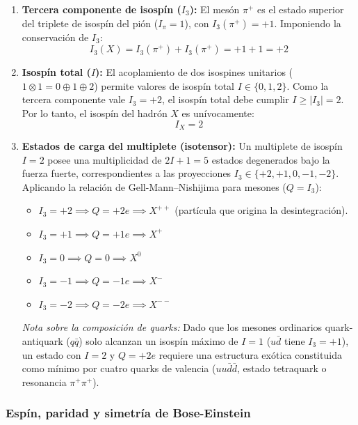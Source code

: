 \begin{problema}
\begin{enumerate}[label=\arabic*.]
    \item \textbf{Tercera componente de isospín ($I_3$):} El mesón $\pi^+$ es el estado superior del triplete de isospín del pión ($I_\pi = 1$), con $I_3(\pi^+) = +1$. Imponiendo la conservación de $I_3$:
    \begin{equation*}
        I_3(X) = I_3(\pi^+) + I_3(\pi^+) = +1 + 1 = +2
    \end{equation*}
    \item \textbf{Isospín total ($I$):} El acoplamiento de dos isospines unitarios ($1 \otimes 1 = 0 \oplus 1 \oplus 2$) permite valores de isospín total $I \in \{0, 1, 2\}$. Como la tercera componente vale $I_3 = +2$, el isospín total debe cumplir $I \ge |I_3| = 2$. Por lo tanto, el isospín del hadrón $X$ es unívocamente:
    \begin{equation*}
        I_X = 2
    \end{equation*}
    \item \textbf{Estados de carga del multiplete (isotensor):} Un multiplete de isospín $I = 2$ posee una multiplicidad de $2I + 1 = 5$ estados degenerados bajo la fuerza fuerte, correspondientes a las proyecciones $I_3 \in \{+2, +1, 0, -1, -2\}$. Aplicando la relación de Gell-Mann--Nishijima para mesones ($Q = I_3$):
    \begin{itemize}
        \item $I_3 = +2 \implies Q = +2e \implies X^{++}$ (partícula que origina la desintegración).
        \item $I_3 = +1 \implies Q = +1e \implies X^+$
        \item $I_3 = 0 \implies Q = 0 \implies X^0$
        \item $I_3 = -1 \implies Q = -1e \implies X^-$
        \item $I_3 = -2 \implies Q = -2e \implies X^{--}$
    \end{itemize}
    \textit{Nota sobre la composición de quarks:} Dado que los mesones ordinarios quark-antiquark ($q\bar{q}$) solo alcanzan un isospín máximo de $I = 1$ ($u\bar{d}$ tiene $I_3 = +1$), un estado con $I = 2$ y $Q = +2e$ requiere una estructura exótica constituida como mínimo por cuatro quarks de valencia ($uu\bar{d}\bar{d}$, estado tetraquark o resonancia $\pi^+\pi^+$).
\end{enumerate}

\subsubsection*{Espín, paridad y simetría de Bose-Einstein}


\end{problema}
